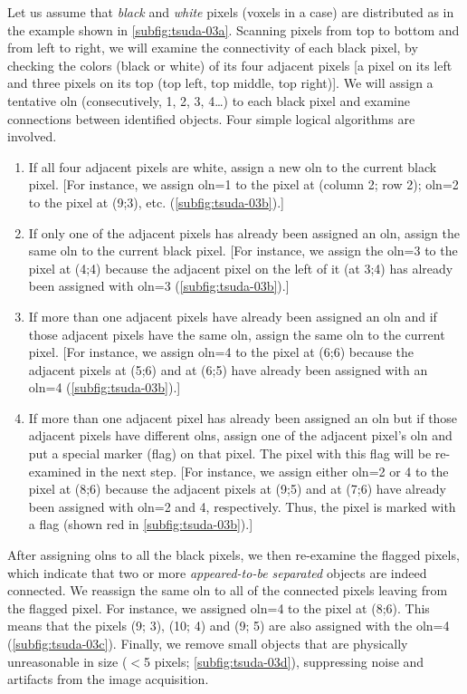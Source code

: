 Let us assume that \emph{black} and \emph{white} pixels (voxels in a \threed case) are distributed as in the example shown in \autoref{subfig:tsuda-03a}. Scanning pixels from top to bottom and from left to right, we will examine the connectivity of each black pixel, by checking the colors (black or white) of its four adjacent pixels [a pixel on its left and three pixels on its top (top left, top middle, top right)]. We will assign a tentative \acf{oln} (consecutively, 1, 2, 3, 4\ldots) to each black pixel and examine connections between identified objects. Four simple logical algorithms are involved.
\begin{enumerate}
	\item If all four adjacent pixels are white, assign a new \ac{oln} to the current black pixel. [For instance, we assign \ac{oln}=1 to the pixel at (column 2; row 2); \ac{oln}=2 to the pixel at (9;3), etc. (\autoref{subfig:tsuda-03b}).]
	\item If only one of the adjacent pixels has already been assigned an \ac{oln}, assign the same \ac{oln} to the current black pixel. [For instance, we assign the \ac{oln}=3 to the pixel at (4;4) because the adjacent pixel on the left of it (at 3;4) has already been assigned with \ac{oln}=3 (\autoref{subfig:tsuda-03b}).]
	\item If more than one adjacent pixels have already been assigned an \ac{oln} and if those adjacent pixels have the same \ac{oln}, assign the same \ac{oln} to the current pixel. [For instance, we assign \ac{oln}=4 to the pixel at (6;6) because the adjacent pixels at (5;6) and at (6;5) have already been assigned with an \ac{oln}=4 (\autoref{subfig:tsuda-03b}).]
	\item If more than one adjacent pixel has already been assigned an \ac{oln} but if those adjacent pixels have different \acp{oln}, assign one of the adjacent pixel's \ac{oln} and put a special marker (flag) on that pixel. The pixel with this flag will be re-examined in the next step. [For instance, we assign either \ac{oln}=2 or 4 to the pixel at (8;6) because the adjacent pixels at (9;5) and at (7;6) have already been assigned with \ac{oln}=2 and 4, respectively. Thus, the pixel is marked with a flag (shown red in \autoref{subfig:tsuda-03b}).]
\end{enumerate}
After assigning \acp{oln} to all the black pixels, we then re-examine the flagged pixels, which indicate that two or more \emph{appeared-to-be separated} objects are indeed connected. We reassign the same \ac{oln} to all of the connected pixels leaving from the flagged pixel. For instance, we assigned \ac{oln}=4 to the pixel at (8;6). This means that the pixels (9; 3), (10; 4) and (9; 5) are also assigned with the \ac{oln}=4 (\autoref{subfig:tsuda-03c}). Finally, we remove small objects that are physically unreasonable in size ($<$5 pixels; \autoref{subfig:tsuda-03d}), suppressing noise and artifacts from the image acquisition.

